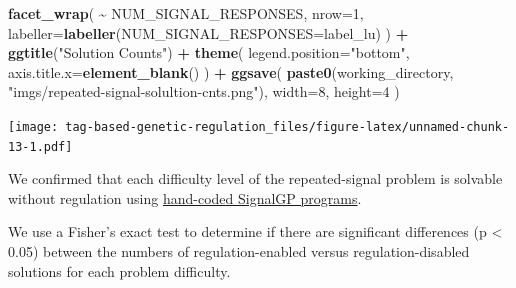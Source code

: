\documentclass[
]{book}
\newenvironment{Shaded}{\begin{snugshade}}{\end{snugshade}}
\newcommand{\DataTypeTok}[1]{\textcolor[rgb]{0.13,0.29,0.53}{#1}}
\newcommand{\DecValTok}[1]{\textcolor[rgb]{0.00,0.00,0.81}{#1}}
\newcommand{\KeywordTok}[1]{\textcolor[rgb]{0.13,0.29,0.53}{\textbf{#1}}}
\newcommand{\NormalTok}[1]{#1}
\newcommand{\OperatorTok}[1]{\textcolor[rgb]{0.81,0.36,0.00}{\textbf{#1}}}
\newcommand{\StringTok}[1]{\textcolor[rgb]{0.31,0.60,0.02}{#1}}
\begin{document}
\begin{Shaded}
\begin{Highlighting}[]
\StringTok{  }\KeywordTok{facet\_wrap}\NormalTok{(}
    \OperatorTok{\textasciitilde{}}\StringTok{ }\NormalTok{NUM\_SIGNAL\_RESPONSES,}
    \DataTypeTok{nrow=}\DecValTok{1}\NormalTok{,}
    \DataTypeTok{labeller=}\KeywordTok{labeller}\NormalTok{(}\DataTypeTok{NUM\_SIGNAL\_RESPONSES=}\NormalTok{label\_lu)}
\NormalTok{  ) }\OperatorTok{+}
\StringTok{  }\KeywordTok{ggtitle}\NormalTok{(}\StringTok{"Solution Counts"}\NormalTok{) }\OperatorTok{+}
\StringTok{  }\KeywordTok{theme}\NormalTok{(}
    \DataTypeTok{legend.position=}\StringTok{"bottom"}\NormalTok{,}
    \DataTypeTok{axis.title.x=}\KeywordTok{element\_blank}\NormalTok{()}
\NormalTok{  ) }\OperatorTok{+}
\StringTok{  }\KeywordTok{ggsave}\NormalTok{(}
    \KeywordTok{paste0}\NormalTok{(working\_directory, }\StringTok{"imgs/repeated{-}signal{-}solultion{-}cnts.png"}\NormalTok{),}
    \DataTypeTok{width=}\DecValTok{8}\NormalTok{,}
    \DataTypeTok{height=}\DecValTok{4}
\NormalTok{  )}
\end{Highlighting}
\end{Shaded}

\texttt{[image: tag-based-genetic-regulation\_files/figure-latex/unnamed-chunk-13-1.pdf]}

We confirmed that each difficulty level of the repeated-signal problem is solvable without regulation using \href{https://github.com/amlalejini/Tag-based-Genetic-Regulation-for-LinearGP/blob/master/documents/handcoded-examples.md}{hand-coded SignalGP programs}.

We use a Fisher's exact test to determine if there are significant differences (p \textless{} 0.05) between the numbers of regulation-enabled versus regulation-disabled solutions for each problem difficulty.
\end{document}
